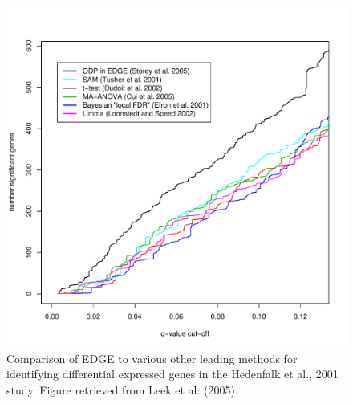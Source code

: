 \documentclass{article}\usepackage[]{graphicx}\usepackage[]{color}
\begin{document}
\begin{figure}[ht]
\begin{center}
\includegraphics[scale=.50]{edgecomp.pdf}
\end{center}
\caption{Comparison of EDGE to various other leading methods for identifying differential expressed genes in the Hedenfalk et al., 2001 study. Figure retrieved from Leek et al. (2005).}
\label{fig:test}
\end{figure}
\end{document}
